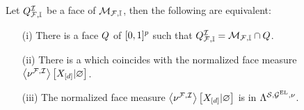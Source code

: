 \begin{theorem}
    \label{the:faceMeasureHardLogicNetworks}
    Let $Q^{\mathcal{I}}_{\mathcal{F},\mathbb{I}}$ be a face of $\mathcal{M}_{\mathcal{F},\mathbb{I}}$, then the following are equivalent:
    \begin{itemize}
        \item[(i)] There is a face $Q$ of $[0,1]^{p}$ such that $Q^{\mathcal{I}}_{\mathcal{F},\mathbb{I}}=\mathcal{M}_{\mathcal{F},\mathbb{I}}\cap Q$.
        \item[(ii)] There is a \HardLogicNetwork{} which coincides with the normalized face measure $\left\langle \nu^{\mathcal{F},\mathcal{I}}\right\rangle \left[ X_{[d]} | \varnothing \right]$.
        \item[(iii)] The normalized face measure $\left\langle \nu^{\mathcal{F},\mathcal{I}}\right\rangle \left[ X_{[d]} | \varnothing \right]$ is in $\Lambda^{\mathcal{S},\mathcal{G}^{\mathrm{EL}},\nu}$.
    \end{itemize}
\end{theorem}
